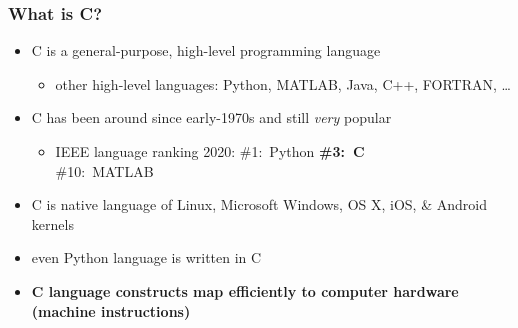 \documentclass[english,14pt]{beamer}
\begin{document}

\begin{frame}[fragile]

\frametitle{What is C?}

\begin{itemize}
	\item C is a general-purpose, high-level programming language
	\begin{itemize}
		\item other high-level languages: Python, MATLAB, Java, C++, FORTRAN, \ldots
	\end{itemize}
	\item C has been around since early-1970s and still \emph{very} popular
	\begin{itemize}
		\item IEEE language ranking 2020: \#1:~Python \textbf{\#3:~C} \\ \#10:~MATLAB
	\end{itemize}
	\item C is native language of Linux, Microsoft Windows, OS X, iOS, \& Android kernels
	\item even Python language is written in C
	\item \textbf{C language constructs map efficiently to computer hardware (machine instructions)}
\end{itemize}

\end{frame}

\end{document}
